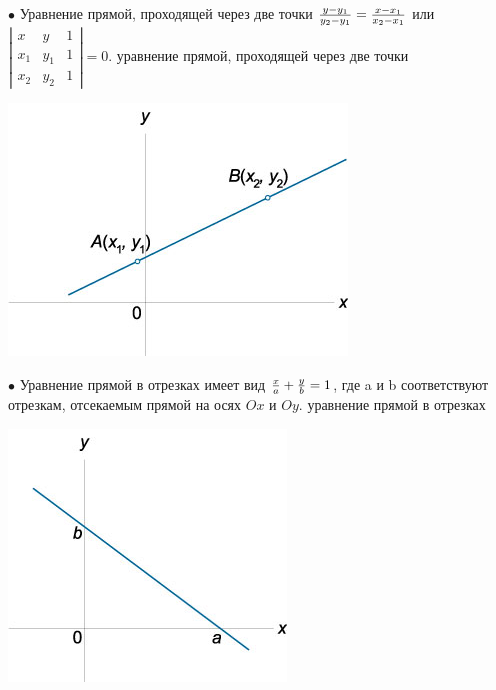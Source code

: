 \documentclass[oneside]{book}
\begin{document}
\begin{enumerate}
\begin{itemize}
\begin{enumerate}
$\bullet$ Уравнение прямой, проходящей через две точки  
$\large\frac{{y - {y_1}}}{{{y_2} - {y_1}}}\normalsize = \large\frac{{x - {x_1}}}{{{x_2} - {x_1}}}\normalsize$  или $ \left| {\begin{array}{*{20}{c}} x & y & 1\\ {{x_1}} & {{y_1}} & 1\\ {{x_2}} & {{y_2}} & 1 \end{array}} \right| = 0$.
уравнение прямой, проходящей через две точки

\begin{center}
\includegraphics[scale=0.4]{./pics/6.jpg}
\end{center}

$\bullet$ Уравнение прямой в отрезках имеет вид
$\large\frac{x}{a}\normalsize + \large\frac{y}{b}\normalsize = 1$,
где a и b соответствуют отрезкам, отсекаемым прямой на осях $Ox$ и $Oy$.
уравнение прямой в отрезках
\begin{center}
\includegraphics[scale=0.4]{./pics/7.jpg}
\end{center}


\end{enumerate}
\end{itemize}
\end{enumerate}
\end{document}
